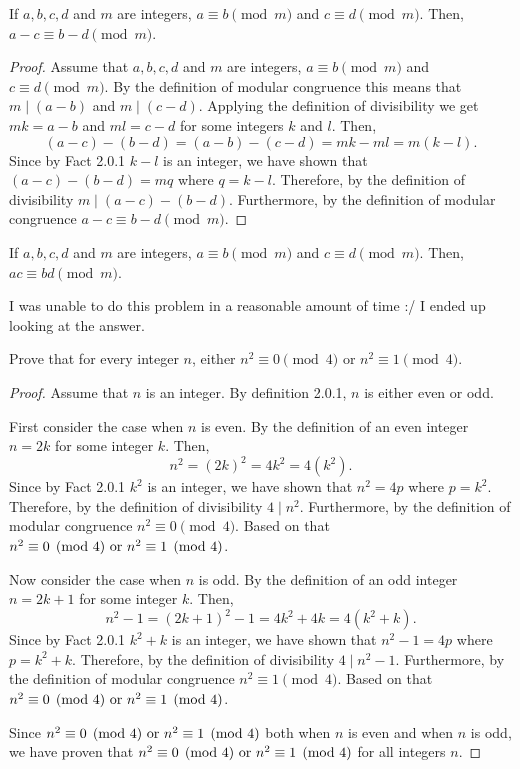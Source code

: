 \documentclass{report}
\begin{document}
\begin{proposition}{}{}
  If $a,b,c,d$ and $m$ are integers, $a \equiv b \pmod{m}$ and $c \equiv d \pmod{m}$. Then, $a - c \equiv b - d \pmod{m}$.
\end{proposition}

\begin{proof}
  Assume that $a,b,c,d$ and $m$ are integers, $a \equiv b \pmod{m}$ and $c \equiv d \pmod{m}$.
  By the definition of modular congruence this means that $m \mid (a - b)$ and $m \mid (c - d)$.
  Applying the definition of divisibility we get $mk = a - b$ and $ml = c - d$ for some integers $k$ and $l$.
  Then, $$(a - c) -(b - d) = (a - b) -(c - d) = mk - ml = m(k-l).$$
  Since by Fact 2.0.1 $k - l$ is an integer, we have shown that $(a - c) - (b - d) = mq$ where $q = k - l$.
  Therefore, by the definition of divisibility $m \mid (a - c) - (b - d)$.
  Furthermore, by the definition of modular congruence $a - c \equiv b - d \pmod{m}$.
\end{proof}

\begin{proposition}{}{}
  If $a,b,c,d$ and $m$ are integers, $a \equiv b \pmod{m}$ and $c \equiv d \pmod{m}$. Then, $ac \equiv bd \pmod{m}$.
\end{proposition}

I was unable to do this problem in a reasonable amount of time :/ I ended up looking at the answer.

\begin{proposition}{}{}
  Prove that for every integer $n$, either $n^2 \equiv 0 \pmod{4}$ or $n^2 \equiv 1 \pmod{4}$.
\end{proposition}

\begin{proof}
  Assume that $n$ is an integer. By definition 2.0.1, $n$ is either even or odd.

  First consider the case when $n$ is even. By the definition of an even integer $n = 2k$ for some integer $k$.
  Then, $$n^2 = (2k)^2 = 4k^2 = 4(k^2).$$
  Since by Fact 2.0.1 $k^2$ is an integer, we have shown that $n^2 = 4p$ where $p = k^2$.
  Therefore, by the definition of divisibility $4 \mid n^2$.
  Furthermore, by the definition of modular congruence $n^2 \equiv 0 \pmod{4}$.
  Based on that $n^2 \equiv 0 \pmod{4} \text{ or } n^2 \equiv 1 \pmod{4}$.

  Now consider the case when $n$ is odd. By the definition of an odd integer $n = 2k + 1$ for some integer $k$.
  Then, $$n^2 - 1 = (2k+1)^2 - 1 = 4k^2+4k= 4(k^2+k).$$
  Since by Fact 2.0.1 $k^2+k$ is an integer, we have shown that $n^2 - 1 = 4p$ where $p = k^2+k$.
  Therefore, by the definition of divisibility $4 \mid n^2 - 1$.
  Furthermore, by the definition of modular congruence $n^2 \equiv 1 \pmod{4}$.
  Based on that $n^2 \equiv 0 \pmod{4} \text{ or } n^2 \equiv 1 \pmod{4}$.

  Since $n^2 \equiv 0 \pmod{4} \text{ or } n^2 \equiv 1 \pmod{4}$ both when $n$ is even and when $n$ is odd,
  we have proven that $n^2 \equiv 0 \pmod{4} \text{ or } n^2 \equiv 1 \pmod{4}$ for all integers $n$.
\end{proof}
\end{document}
